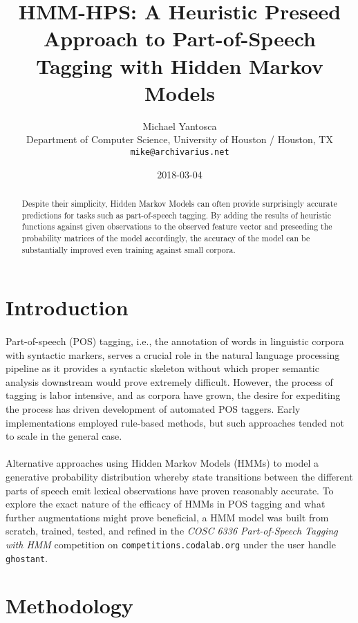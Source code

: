 \documentclass[11pt,a4paper]{article}
\title{HMM-HPS: A Heuristic Preseed Approach to Part-of-Speech Tagging with Hidden Markov Models}
\author{Michael Yantosca \\
  Department of Computer Science, University of Houston / Houston, TX \\
  {\tt mike@archivarius.net} \\}
\date{2018-03-04}
\begin{document}
\maketitle
\begin{abstract}
  Despite their simplicity, Hidden Markov Models can often
  provide surprisingly accurate predictions for tasks such
  as part-of-speech tagging. By adding the results of
  heuristic functions against given observations to the
  observed feature vector and preseeding the probability
  matrices of the model accordingly, the accuracy of the
  model can be substantially improved even training
  against small corpora.
\end{abstract}

\section{Introduction}

\paragraph{}
Part-of-speech (POS) tagging, i.e., the annotation of words in linguistic corpora with syntactic
markers, serves a crucial role in the natural language processing pipeline as it provides
a syntactic skeleton without which proper semantic analysis downstream would prove extremely difficult.
However, the process of tagging is labor intensive, and as corpora have grown, the desire
for expediting the process has driven development of automated POS taggers. Early implementations
employed rule-based methods, but such approaches tended not to scale in the general case.

\paragraph{}
Alternative approaches using Hidden Markov Models (HMMs) to model a generative probability
distribution whereby state transitions between the different parts of speech emit lexical
observations have proven reasonably accurate.
To explore the exact nature of the efficacy of HMMs in POS tagging and what further
augmentations might prove beneficial, a HMM model was built from scratch, trained,
tested, and refined in the \emph{COSC 6336 Part-of-Speech Tagging with HMM} competition
on \texttt{competitions.codalab.org} under the user handle \texttt{ghostant}.

\section{Methodology}
\end{document}
